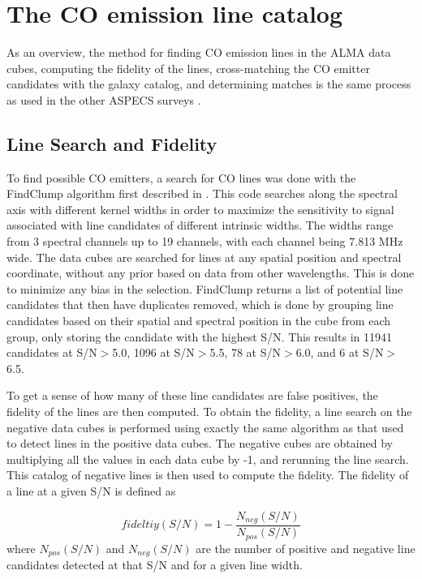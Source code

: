 \section{The CO emission line catalog}

As an overview, the method for finding CO emission lines in the ALMA data cubes, computing the fidelity of the lines, cross-matching the CO emitter candidates with the galaxy catalog, and determining matches is the same process as used in the other ASPECS surveys \cite{walter2016alma, decarli2019alma, gonzalez2019alma}.

\subsection{Line Search and Fidelity}

To find possible CO emitters, a search for CO lines was done with the FindClump algorithm first described in \cite{walter2016alma}. This code searches along the spectral axis with different kernel widths in order to maximize the sensitivity to signal associated with line candidates of different intrinsic widths. The widths range from 3 spectral channels up to 19 channels, with each channel being 7.813 MHz wide. The data cubes are searched for lines at any spatial position and spectral coordinate, without any prior based on data from other wavelengths. This is done to minimize any bias in the selection. FindClump returns a list of potential line candidates that then have duplicates removed, which is done by grouping line candidates based on their spatial and spectral position in the cube from each group, only storing the candidate with the highest S/N. This results in 11941 candidates at S/N$>$5.0, 1096 at S/N$>$5.5, 78 at S/N$>$6.0, and 6 at S/N$>$6.5. 

To get a sense of how many of these line candidates are false positives, the fidelity of the lines are then computed. To obtain the fidelity, a line search on the negative data cubes is performed using exactly the same algorithm as that used to detect lines in the positive data cubes. The negative cubes are obtained by multiplying all the values in each data cube by -1, and rerunning the line search. This catalog of negative lines is then used to compute the fidelity. The fidelity of a line at a given S/N is defined as 

$$ fideltiy(S/N) = 1 - \frac{N_{neg}(S/N)}{N_{pos}(S/N)} $$ where $N_{pos}(S/N)$ and $N_{neg}(S/N)$ are the number of positive and negative line candidates detected at that S/N and for a given line width\cite{gonzalez2019alma}. %

